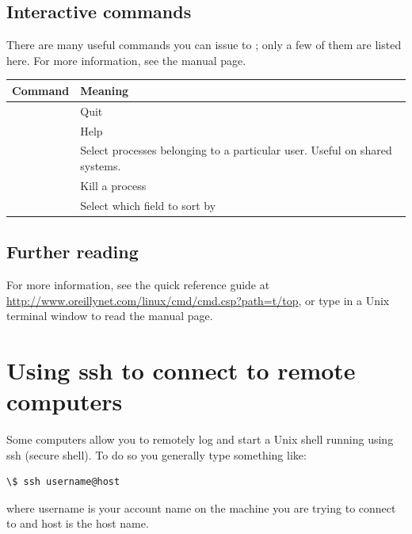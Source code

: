 \documentclass[letterpaper,10pt,english]{sphinxmanual}
\begin{document}
\subsection{Interactive commands}
\label{top:interactive-commands}
There are many useful commands you can issue to ; only a few of
them are listed here.  For more information, see the  manual
page.

\begin{tabulary}{\linewidth}{|L|L|}
\hline
\textbf{
Command
} & \textbf{
Meaning
}\\\hline

 & 
Quit
\\\hline

 & 
Help
\\\hline

 & 
Select processes belonging to a particular user.  Useful on shared systems.
\\\hline

 & 
Kill a process
\\\hline

 & 
Select which field to sort by
\\\hline
\end{tabulary}



\subsection{Further reading}
\label{top:further-reading}
For more information, see the quick reference guide at
\href{http://www.oreillynet.com/linux/cmd/cmd.csp?path=t/top}{http://www.oreillynet.com/linux/cmd/cmd.csp?path=t/top}, or type
 in a Unix terminal window to read the manual page.


\section{Using ssh to connect to remote computers}
\label{ssh:using-ssh-to-connect-to-remote-computers}\label{ssh::doc}\label{ssh:ssh}
Some computers allow you to remotely log and start a Unix shell running
using ssh (secure shell).  To do so you generally type something like:

\begin{Verbatim}[commandchars=\\\{\}]
\$ ssh username@host
\end{Verbatim}

where username is your account name on the machine you are trying to connect
to and host is the host name.
\end{document}
